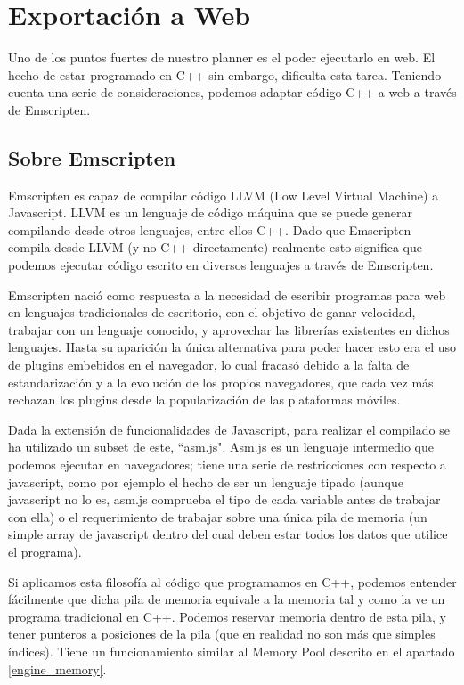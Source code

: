 \label{emscripten}
\section{Exportación a Web}
Uno de los puntos fuertes de nuestro planner es el poder ejecutarlo en web. El hecho de estar programado en C++ sin embargo, dificulta esta tarea. Teniendo cuenta una serie de consideraciones, podemos adaptar código C++ a web a través de Emscripten.

\subsection{Sobre Emscripten}
Emscripten es capaz de compilar código LLVM (Low Level Virtual Machine) a Javascript. LLVM es un lenguaje de código máquina que se puede generar compilando desde otros lenguajes, entre ellos C++. Dado que Emscripten compila desde LLVM (y no C++ directamente) realmente esto significa que podemos ejecutar código escrito en diversos lenguajes a través de Emscripten.

Emscripten nació como respuesta a la necesidad de escribir programas para web en lenguajes tradicionales de escritorio, con el objetivo de ganar velocidad, trabajar con un lenguaje conocido, y aprovechar las librerías existentes en dichos lenguajes. Hasta su aparición la única alternativa para poder hacer esto era el uso de plugins embebidos en el navegador, lo cual fracasó debido a la falta de estandarización y a la evolución de los propios navegadores, que cada vez más rechazan los plugins desde la popularización de las plataformas móviles.

Dada la extensión de funcionalidades de Javascript, para realizar el compilado se ha utilizado un subset de este, ``asm.js". Asm.js es un lenguaje intermedio que podemos ejecutar en navegadores; tiene una serie de restricciones con respecto a javascript, como por ejemplo el hecho de ser un lenguaje tipado (aunque javascript no lo es, asm.js comprueba el tipo de cada variable antes de trabajar con ella) o el requerimiento de trabajar sobre una única pila de memoria (un simple array de javascript dentro del cual deben estar todos los datos que utilice el programa).

Si aplicamos esta filosofía al código que programamos en C++, podemos entender fácilmente que dicha pila de memoria equivale a la memoria tal y como la ve un programa tradicional en C++. Podemos reservar memoria dentro de esta pila, y tener punteros a posiciones de la pila (que en realidad no son más que simples índices). Tiene un funcionamiento similar al Memory Pool descrito en el apartado \ref{engine_memory}.


